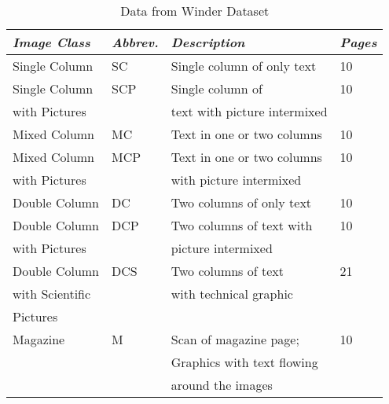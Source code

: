 \documentclass[conference]{IEEEtran}
\begin{document}
\begin{table}
\caption{Data from Winder Dataset}
\label{table:Winder Image Classes}
\begin{tabular}{|l|l|l|l|}
\hline
\textit{\textbf{Image Class}} & \textit{\textbf{Abbrev.}} & \textit{\textbf{Description}} & \textit{\textbf{Pages}}  \\ 
\hline
\hline
    Single Column & SC & Single column of only text &  10  \\ 
    \hline
    Single Column & SCP & Single column of & 10 \\
    with Pictures &     & text with picture intermixed &    \\ 
    \hline

    Mixed Column & MC & Text in one or two columns & 10 \\
    \hline

    Mixed Column & MCP & Text in one or two columns & 10 \\
    with Pictures&    & with picture intermixed & \\

    \hline
    Double Column & DC & Two columns of only text & 10 \\  
    \hline
    Double Column & DCP & Two columns of text with & 10 \\ 
    with Pictures &     & picture intermixed &    \\  
    \hline
    Double Column  & DCS & Two columns of text & 21 \\
    with Scientific &     &  with technical graphic  & \\ 
    Pictures &  & & \\ 
    \hline
    Magazine & M & Scan of magazine page; & 10 \\
             &   & Graphics with text flowing & \\
             &   & around the images & \\
\hline
\end{tabular}
\end{table}
\end{document}
